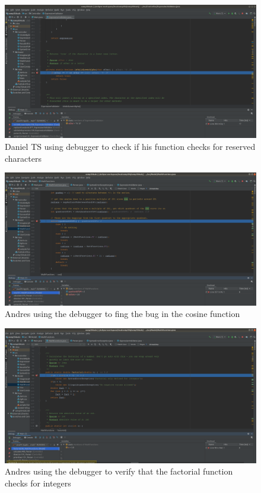 \documentclass[a4paper, 12pt]{article}
\begin{document}
\vspace{20mm}


\begin{figure}[H]
\centering
\includegraphics[width=1.13\textwidth]{dan2.png}
\caption{Daniel TS using debugger to check if his function checks for reserved characters}
\label{Dan2}
\end{figure}

\vspace{20mm}
\begin{figure}[H]
\centering
\includegraphics[width=1.13\textwidth]{Andres1.png}
\caption{Andres using the debugger to fing the bug in the cosine function}
\label{Andres1}
\end{figure}


\vspace{20mm}
\begin{figure}[H]
\centering
\includegraphics[width=1.13\textwidth]{Andres2.png}
\caption{Andres using the debugger to verify that the factorial function checks for integers}
\label{Andres2}
\end{figure}
\end{document}
